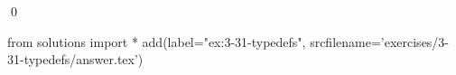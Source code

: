 
\begin{ex}
  \label{ex:3-31-typedefs}
  
  \qed
\end{ex}
\begin{python0}
from solutions import *
add(label="ex:3-31-typedefs",
    srcfilename='exercises/3-31-typedefs/answer.tex')
\end{python0}

